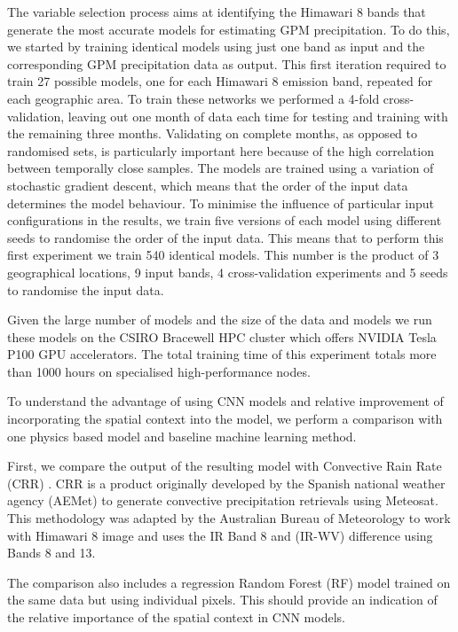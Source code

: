 \documentclass[3p,times]{elsarticle}
\begin{document}
The variable selection process aims at identifying the Himawari 8 bands that generate the most accurate models for estimating GPM precipitation. To do this, we started by training identical models using just one band as input and the corresponding GPM precipitation data as output. This first iteration required to train 27 possible models, one for each Himawari 8 emission band, repeated for each geographic area. To train these networks we performed a 4-fold cross-validation, leaving out one month of data each time for testing and training with the remaining three months. Validating on complete months, as opposed to randomised sets, is particularly important here because of the high correlation between temporally close samples. The models are trained using a variation of stochastic gradient descent, which means that the order of the input data determines the model behaviour. To minimise the influence of particular input configurations in the results, we train five versions of each model using different seeds to randomise the order of the input data. This means that to perform this first experiment we train 540 identical models. This number is the product of 3 geographical locations, 9 input bands, 4 cross-validation experiments and 5 seeds to randomise the input data.

Given the large number of models and the size of the data and models we run these models on the CSIRO Bracewell HPC cluster which offers NVIDIA Tesla P100 GPU accelerators. The total training time of this experiment totals more than 1000 hours on specialised high-performance nodes.

To understand the advantage of using CNN models and relative improvement of incorporating the spatial context into the model, we perform a comparison with one physics based model and baseline machine learning method.

First, we compare the output of the resulting model with Convective Rain Rate (CRR) \citep{aemetsaf2013}. CRR is a product originally developed by the Spanish national weather agency (AEMet) to generate convective precipitation retrievals using Meteosat. This methodology was adapted by the Australian Bureau of Meteorology to work with Himawari 8 image and uses the IR Band 8 and (IR-WV) difference using Bands 8 and 13.

The comparison also includes a regression Random Forest (RF) model \citep{breiman2001random} trained on the same data but using individual pixels. This should provide an indication of the relative importance of the spatial context in CNN models.
\end{document}

